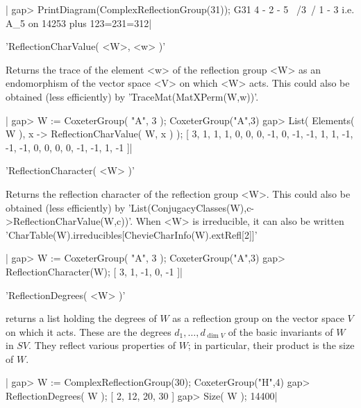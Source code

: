 |    gap> PrintDiagram(ComplexReflectionGroup(31));
    G31 4 - 2 - 5
         \ /3\ /
          1 - 3     i.e. A_5 on 14253 plus 123=231=312|


'ReflectionCharValue( <W>, <w> )'

Returns the trace of  the element <w> of the reflection  group <W> as an
endomorphism of the vector space <V>  on which <W> acts. This could also
be obtained (less efficiently) by 'TraceMat(MatXPerm(W,w))'.

|    gap> W := CoxeterGroup( "A", 3 );
    CoxeterGroup("A",3)
    gap> List( Elements( W ), x -> ReflectionCharValue( W, x ) );
    [ 3, 1, 1, 1, 0, 0, 0, -1, 0, -1, -1, 1, 1, -1, -1, -1, 0, 0, 0, 0,
      -1, -1, 1, -1 ]|


'ReflectionCharacter( <W> )'

Returns  the reflection character  of the reflection  group <W>. This could
also be obtained (less efficiently) by
'List(ConjugacyClasses(W),c->ReflectionCharValue(W,c))'.    When   <W>   is
irreducible, it can also be written
'CharTable(W).irreducibles[ChevieCharInfo(W).extRefl[2]]'

|    gap> W := CoxeterGroup( "A", 3 );
    CoxeterGroup("A",3)
    gap> ReflectionCharacter(W);
    [ 3, 1, -1, 0, -1 ]|


'ReflectionDegrees( <W> )'

returns  a list  holding the  degrees of  $W$ as  a reflection group on the
vector  space $V$ on  which it acts.  These are the degrees $d_1,\ldots,d_{
\dim  V}$ of  the basic  invariants of  $W$ in  $SV$. They  reflect various
properties of $W$; in particular, their product is the size of $W$.

|    gap> W := ComplexReflectionGroup(30);
    CoxeterGroup("H",4)
    gap> ReflectionDegrees( W );
    [ 2, 12, 20, 30 ]
    gap> Size( W );
    14400|



